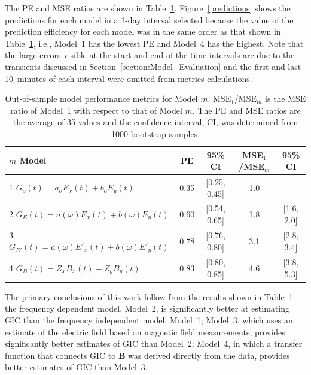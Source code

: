 \documentclass[draft,linenumbers]{agujournal2018}
\begin{document}
The PE and MSE ratios are shown in Table~\ref{results}. Figure~\ref{predictions} shows the predictions for each model in a 1-day interval selected because the value of the prediction efficiency for each model was in the same order as that shown in Table~\ref{results}, i.e., Model~1 has the lowest PE and Model~4 has the highest. Note that the large errors visible at the start and end of the time intervals are due to the transients discussed in Section~\ref{section:Model_Evaluation} and the first and last 10~minutes of each interval were omitted from metrics calculations.

\begin{table}
\caption{Out-of-sample model performance metrics for Model $m$. MSE$_1$/MSE$_m$ is the MSE ratio of Model~1 with respect to that of Model $m$. The PE and MSE ratios are the average of 35 values and the confidence interval, CI, was determined from 1000 bootstrap samples.}
\centering
\begin{tabular}{l c c c c}
\hline
$m$\hspace{1em} Model & PE & 95\% CI & MSE$_1$/MSE$_m$ & 95\% CI\\
\hline
1\hspace{1em} $G_o(t) = a_oE_x(t) + b_oE_y(t)$ & 0.35 & [0.25, 0.45] & 1.0 & \\
2\hspace{1em} $G_E(t) = a(\omega)E_x(t) + b(\omega)E_y(t)$ & 0.60 & [0.54, 0.65] & 1.8 & [1.6, 2.0]\\
3\hspace{1em} $G_{E'}(t) = a(\omega)E'_x(t) + b(\omega)E'_y(t)$ & 0.78 & [0.76, 0.80] & 3.1 & [2.8, 3.4]\\
4\hspace{1em} $G_{B}(t) = Z_xB_x(t) + Z_yB_y(t)$ & 0.83 & [0.80, 0.85] & 4.6 & [3.8, 5.3]\\
\hline
\end{tabular}
\label{results}
\end{table}

The primary conclusions of this work follow from the results shown in Table~\ref{results}: the frequency dependent model, Model~2, is significantly better at estimating GIC than the frequency independent model, Model~1; Model~3, which uses an estimate of the electric field based on magnetic field measurements, provides significantly better estimates of GIC than Model~2; Model~4, in which a transfer function that connects GIC to $\mathbf{B}$ was derived directly from the data, provides better estimates of GIC than Model~3.
\end{document}

